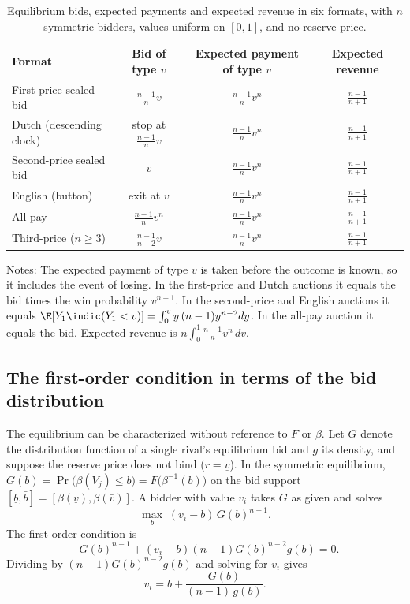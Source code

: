 \begin{table}[htbp]
\centering
\begin{threeparttable}
\caption{Equilibrium bids, expected payments and expected revenue in six formats, with $n$ symmetric bidders, values uniform on $[0,1]$, and no reserve price.}\label{tab:14-uniform-formats}
\small
\begin{tabular}{lccc}
\toprule
Format & Bid of type $v$ & Expected payment of type $v$ & Expected revenue\\
\midrule
First-price sealed bid & $\frac{n-1}{n}v$ & $\frac{n-1}{n}v^n$ & $\frac{n-1}{n+1}$\\[3pt]
Dutch (descending clock) & stop at $\frac{n-1}{n}v$ & $\frac{n-1}{n}v^n$ & $\frac{n-1}{n+1}$\\[3pt]
Second-price sealed bid & $v$ & $\frac{n-1}{n}v^n$ & $\frac{n-1}{n+1}$\\[3pt]
English (button) & exit at $v$ & $\frac{n-1}{n}v^n$ & $\frac{n-1}{n+1}$\\[3pt]
All-pay & $\frac{n-1}{n}v^n$ & $\frac{n-1}{n}v^n$ & $\frac{n-1}{n+1}$\\[3pt]
Third-price ($n\ge 3$) & $\frac{n-1}{n-2}v$ & $\frac{n-1}{n}v^n$ & $\frac{n-1}{n+1}$\\
\bottomrule
\end{tabular}
\begin{tablenotes}
\footnotesize
\item Notes: The expected payment of type $v$ is taken before the outcome is known, so it includes the event of losing. In the first-price and Dutch auctions it equals the bid times the win probability $v^{n-1}$. In the second-price and English auctions it equals $\E[Y_1\indic(Y_1<v)]=\int_0^v y\,(n-1)y^{n-2}dy$. In the all-pay auction it equals the bid. Expected revenue is $n\int_0^1\frac{n-1}{n}v^n\,dv$.
\end{tablenotes}
\end{threeparttable}
\end{table}

\subsection{The first-order condition in terms of the bid distribution}\label{sec:14-fpa-G}

The equilibrium can be characterized without reference to $F$ or $\beta$. Let $G$ denote the distribution function of a single rival's equilibrium bid and $g$ its density, and suppose the reserve price does not bind ($r=\underline v$). In the symmetric equilibrium, $G(b)=\Pr\big(\beta(V_j)\le b\big)=F\big(\beta^{-1}(b)\big)$ on the bid support $[\underline b,\bar b]=[\beta(\underline v),\beta(\bar v)]$. A bidder with value $v_i$ takes $G$ as given and solves
\[
\max_b\;(v_i-b)\,G(b)^{n-1}.
\]
The first-order condition is
\[
-G(b)^{n-1}+(v_i-b)(n-1)G(b)^{n-2}g(b)=0.
\]
Dividing by $(n-1)G(b)^{n-2}g(b)$ and solving for $v_i$ gives
\begin{equation}\label{eq:14-foc-G}
v_i=b+\frac{G(b)}{(n-1)\,g(b)}.
\end{equation}

